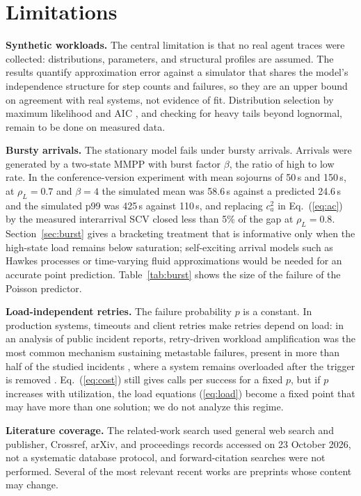 \documentclass[journal]{IEEEtran}
\begin{document}
\section{Limitations}\label{sec:limits}
\textbf{Synthetic workloads.} The central limitation is that no real agent traces were collected: distributions, parameters, and structural profiles are assumed. The results quantify approximation error against a simulator that shares the model's independence structure for step counts and failures, so they are an upper bound on agreement with real systems, not evidence of fit. Distribution selection by maximum likelihood and AIC \cite{akaike1974aic,clauset2009power}, and checking for heavy tails beyond lognormal, remain to be done on measured data.

\textbf{Bursty arrivals.} The stationary model fails under bursty arrivals. Arrivals were generated by a two-state MMPP \cite{fischer1993mmpp} with burst factor $\beta$, the ratio of high to low rate. In the conference-version experiment with mean sojourns of 50\,s and 150\,s, at $\rho_L=0.7$ and $\beta=4$ the simulated mean was 58.6\,s against a predicted 24.6\,s and the simulated p99 was 425\,s against 110\,s, and replacing $c_a^2$ in Eq.~(\ref{eq:ac}) by the measured interarrival SCV closed less than 5\% of the gap at $\rho_L=0.8$. Section~\ref{sec:burst} gives a bracketing treatment that is informative only when the high-state load remains below saturation; self-exciting arrival models such as Hawkes processes \cite{hawkes1971spectra,bacry2015hawkes} or time-varying fluid approximations would be needed for an accurate point prediction. Table~\ref{tab:burst} shows the size of the failure of the Poisson predictor.

\textbf{Load-independent retries.} The failure probability $p$ is a constant. In production systems, timeouts and client retries make retries depend on load: in an analysis of public incident reports, retry-driven workload amplification was the most common mechanism sustaining metastable failures, present in more than half of the studied incidents \cite{huang2022metastable}, where a system remains overloaded after the trigger is removed \cite{bronson2021metastable}. Eq.~(\ref{eq:cost}) still gives calls per success for a fixed $p$, but if $p$ increases with utilization, the load equations (\ref{eq:load}) become a fixed point that may have more than one solution; we do not analyze this regime.

\textbf{Literature coverage.} The related-work search used general web search and publisher, Crossref, arXiv, and proceedings records accessed on 23 October 2026, not a systematic database protocol, and forward-citation searches were not performed. Several of the most relevant recent works are preprints whose content may change.
\end{document}
